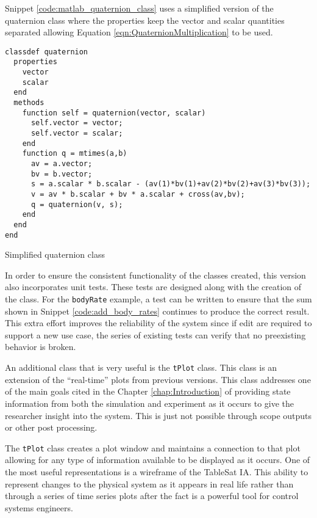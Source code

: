 Snippet \ref{code:matlab_quaternion_class} uses a simplified version of the quaternion class where the properties keep the vector and scalar quantities
separated allowing Equation \ref{eqn:QuaternionMultiplication} to be used.
\begin{listing}[H]
\begin{singlespace}
  \begin{verbatim}
classdef quaternion
  properties
    vector
    scalar
  end
  methods
    function self = quaternion(vector, scalar)
      self.vector = vector;
      self.vector = scalar;
    end
    function q = mtimes(a,b)
      av = a.vector;
      bv = b.vector;
      s = a.scalar * b.scalar - (av(1)*bv(1)+av(2)*bv(2)+av(3)*bv(3));
      v = av * b.scalar + bv * a.scalar + cross(av,bv);
      q = quaternion(v, s);
    end
  end
end
  \end{verbatim}
\caption{Simplified quaternion class}
\label{code:matlab_quaternion_class}
\nocite{minted}
\end{singlespace}
\end{listing}

In order to ensure the consistent functionality of the classes created, this version also incorporates unit tests.  These tests are designed along with the creation of the class.  For the \verb|bodyRate| example, a test can be written to ensure that the sum shown in Snippet \ref{code:add_body_rates} continues to produce the correct result.  This extra effort improves the reliability of the system since if edit are required to support a new use case, the series of existing tests can verify that no preexisting behavior is broken.

An additional class that is very useful is the \verb|tPlot| class.  This class is an extension of the ``real-time'' plots from previous versions.  This class addresses one of the main goals cited in the Chapter \ref{chap:Introduction} of providing state information from both the simulation and experiment as it occurs to give the researcher insight into the system.  This is just not possible through scope outputs or other post processing.

The \verb|tPlot| class creates a plot window and maintains a connection to that plot allowing for any type of information available to be displayed as it occurs.  One of the most useful representations is a wireframe of the TableSat IA.  This ability to represent changes to the physical system as it appears in real life rather than through a series of time series plots after the fact is a powerful tool for control systems engineers.

